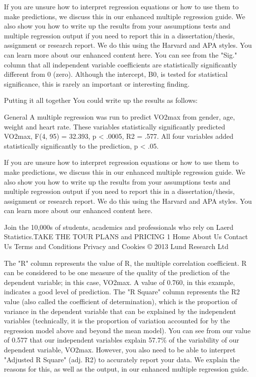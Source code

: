 \documentclass[]{article}
\begin{document}
		If you are unsure how to interpret regression equations or how to use them to make predictions, we discuss this in our enhanced multiple regression guide. We also show you how to write up the results from your assumptions tests and multiple regression output if you need to report this in a dissertation/thesis, assignment or research report. We do this using the Harvard and APA styles. You can learn more about our enhanced content here.
		You can see from the "Sig." column that all independent variable coefficients are statistically significantly different from 0 (zero). Although the intercept, B0, is tested for statistical significance, this is rarely an important or interesting finding.
		
		Putting it all together
		You could write up the results as follows:
		
		General
		A multiple regression was run to predict VO2max from gender, age, weight and heart rate. These variables statistically significantly predicted VO2max, F(4, 95) = 32.393, p < .0005, R2 = .577. All four variables added statistically significantly to the prediction, p < .05.
		
		If you are unsure how to interpret regression equations or how to use them to make predictions, we discuss this in our enhanced multiple regression guide. We also show you how to write up the results from your assumptions tests and multiple regression output if you need to report this in a dissertation/thesis, assignment or research report. We do this using the Harvard and APA styles. You can learn more about our enhanced content here.
		
		Join the 10,000s of students, academics and professionals who rely on Laerd Statistics.TAKE THE TOUR PLANS and PRICING
		1
		Home About Us Contact Us Terms and Conditions Privacy and Cookies © 2013 Lund Research Ltd
		
		The "R" column represents the value of R, the multiple correlation coefficient. R can be considered to be one measure of the quality of the prediction of the dependent variable; in this case, VO2max. A value of 0.760, in this example, indicates a good level of prediction. The "R Square" column represents the R2 value (also called the coefficient of determination), which is the proportion of variance in the dependent variable that can be explained by the independent variables (technically, it is the proportion of variation accounted for by the regression model above and beyond the mean model). You can see from our value of 0.577 that our independent variables explain 57.7\% of the variability of our dependent variable, VO2max. However, you also need to be able to interpret "Adjusted R Square" (adj. R2) to accurately report your data. We explain the reasons for this, as well as the output, in our enhanced multiple regression guide.
		
\end{document}
